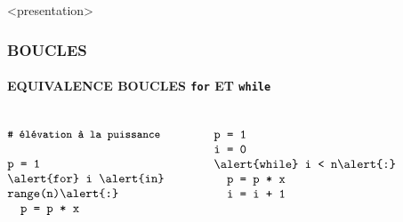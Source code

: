 \begin{frame}<presentation>
\frametitle{\uppercase{Boucles}}
\framesubtitle{\uppercase{Equivalence boucles {\tt for} et {\tt while}}}
\begin{columns}[T]
\column{5.25cm}

$$\begin{minipage}{5.25cm}\tt
{\small\# élévation à la puissance}\\
\mbox{}\\
p = 1\\
\alert{for} i \alert{in} range(n)\alert{:}\\
\mbox{}\ \ p = p * x
\end{minipage}$$

\column{5.25cm}

$$\begin{minipage}{5.25cm}\tt
p = 1\\
i = 0\\
\alert{while} i < n\alert{:} \\
\mbox{}\ \ p = p * x\\
\mbox{}\ \ i = i + 1
\end{minipage}$$

\end{columns}

\end{frame}
